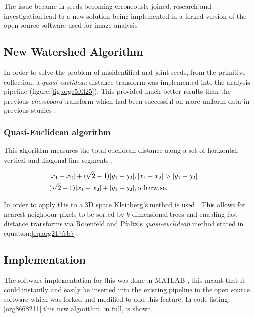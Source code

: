 \documentclass[11pt]{report}
\begin{document}
The issue became in seeds becoming erroneously joined, research and investigation lead to a new solution being implemented in a forked version of the open source software used for image analysis \cite{Hughes2017}

\subsection{New Watershed Algorithm}
\label{sec:org6e06b28}

In order to solve the problem of misidentified and joint seeds, from the primitive collection,
a  \emph{quasi-euclidean} distance transform was implemented into the analysis pipeline (figure:\ref{fig:orgc5f0f25}). This provided much better results than the previous
\emph{chessboard} transform which had been successful on more uniform data in previous studies \cite{Hughes2017}.

\subsubsection{Quasi-Euclidean algorithm}
\label{sec:org98dbf13}

This algorithm measures the total euclidean distance along a set of horizontal, vertical and diagonal
line segments \cite{Pfaltz1966}.

\begin{align}
\label{eq:org217fcb7}
  &\begin{aligned}
&|x_1-x_2|+(\sqrt{2}-1)|y_1-y_2|, |x_1-x_2| > |y_1-y_2| \\
      &(\sqrt{2}-1)|x_1-x_2| + |y_1-y_2|, \textup{otherwise.}
  \end{aligned}
\end{align}

In order to apply this to a 3D space Kleinberg's method is used  \cite{Kleinberg1997}. This allows for nearest neighbour pixels to be sorted by \(k\) dimensional trees
and enabling fast distance transforms via Rosenfeld and Pfaltz's \emph{quasi-euclidean} method stated in equation:\ref{eq:org217fcb7}.

\subsection{Implementation}
\label{sec:orge7d68ef}

The software implementation for this was done in MATLAB \cite{MATHWORKS2017}, this meant that it could instantly and easily be inserted into the existing pipeline in the open source software which was forked and modified to add this feature. In code listing:\ref{org8668211} this new algorithm, in full, is shown.
\end{document}

